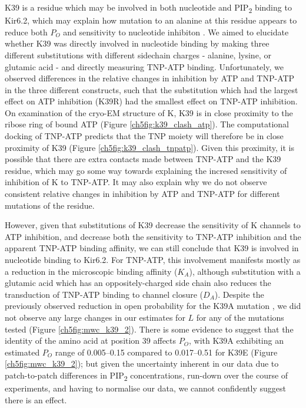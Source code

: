 K39 is a residue which may be involved in both nucleotide and PIP\textsubscript{2} binding to Kir6.2, which may explain how mutation to an alanine at this residue appears to reduce both $P_O$ and sensitivity to nucleotide inhibiton \cite{cukras_role_2002, tucker_molecular_1998}.
We aimed to elucidate whether K39 was directly involved in nucleotide binding by making three different substitutions with different sidechain charges - alanine, lysine, or glutamic acid - and directly measuring TNP-ATP binding.
Unfortunately, we observed differences in the relative changes in inhibition by ATP and TNP-ATP in the three different constructs, such that the substitution which had the largest effect on ATP inhibition (K39R) had the smallest effect on TNP-ATP inhibition.
On examination of the cryo-EM structure of K\ATP{}, K39 is in close proximity to the ribose ring of bound ATP (Figure \ref{ch5fig:k39_clash_atp}).
The computational docking of TNP-ATP predicts that the TNP moiety will therefore be in close proximity of K39 (Figure \ref{ch5fig:k39_clash_tnpatp}).
Given this proximity, it is possible that there are extra contacts made between TNP-ATP and the K39 residue, which may go some way towards explaining the incresed sensitivity of inhibition of K\ATP{} to TNP-ATP.
It may also explain why we do not observe consistent relative changes in inhibition by ATP and TNP-ATP for different mutations of the residue.

However, given that substitutions of K39 decrease the sensitivity of K\ATP{} channels to ATP inhibition, and decrease both the sensitivity to TNP-ATP inhibition and the apparent TNP-ATP binding affinity, we can still conclude that K39 is involved in nucleotide binding to Kir6.2.
For TNP-ATP, this involvement manifests mostly as a reduction in the microscopic binding affinity ($K_A$), although substitution with a glutamic acid which has an oppositely-charged side chain also reduces the transduction of TNP-ATP binding to channel closure ($D_A$).
Despite the previously observed reduction in open probability for the K39A mutation \cite{cukras_role_2002, tucker_molecular_1998}, we did not observe any large changes in our estimates for $L$ for any of the mutations tested (Figure \ref{ch5fig:mwc_k39_2}).
There is some evidence to suggest that the identity of the amino acid at position 39 affects $P_O$, with K39A exhibiting an estimated $P_O$ range of \numrange{0.005}{0.15} compared to \numrange{0.017}{0.51} for K39E (Figure \ref{ch5fig:mwc_k39_2}); but given the uncertainty inherent in our data due to patch-to-patch differences in PIP\textsubscript{2} concentrations, run-down over the course of experiments, and having to normalise our data, we cannot confidently suggest there is an effect.